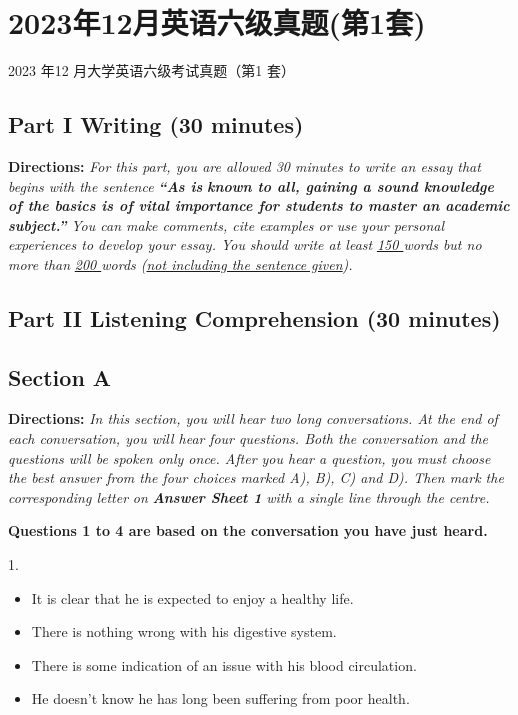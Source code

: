 \documentclass[UTF8,11pt]{ctexart}
\begin{document}
\section*{2023年12月英语六级真题(第1套)}
2023 年12 月大学英语六级考试真题（第1 套）


\subsection*{\textbf{Part I Writing} \textbf{(30 minutes)}}


\textbf{Directions:}\textit{ For this part, you are allowed 30 minutes to write an essay that begins with the sentence }\textbf{\textit{“As is}} \textbf{\textit{known to all, gaining a sound knowledge of the basics is of vital importance for students to master an academic}} \textbf{\textit{subject.”}}\textit{ You can make comments, cite examples or use your personal experiences to develop your essay. You} \textit{should write at least }\textit{\uline{150 }}\textit{words but no more than }\textit{\uline{200 }}\textit{words (}\textit{\uline{not including the sentence given}}\textit{).}


\subsection*{\textbf{Part II} \textbf{Listening Comprehension} \textbf{(30 minutes)}}


\subsection*{\textbf{Section A}}


\textbf{Directions:} \textit{In this section, you will hear two long conversations. At the end of each conversation, you will hear} \textit{four questions. Both the conversation and the questions will be spoken only once. After you hear a question, you} \textit{must choose the best answer from the four choices marked A), B), C) and D). Then mark the corresponding letter} \textit{on }\textbf{\textit{Answer Sheet 1}}\textit{ with a single line through the centre.}


\textbf{Questions 1 to 4 are based on the conversation you have just heard.}


1.


\begin{itemize}[leftmargin=2em,itemsep=.2em,topsep=.4em]\item[A.] It is clear that he is expected to enjoy a healthy life.
\item[B.] There is nothing wrong with his digestive system.
\item[C.] There is some indication of an issue with his blood circulation.
\item[D.] He doesn’t know he has long been suffering from poor health.
\end{itemize}
\end{document}
